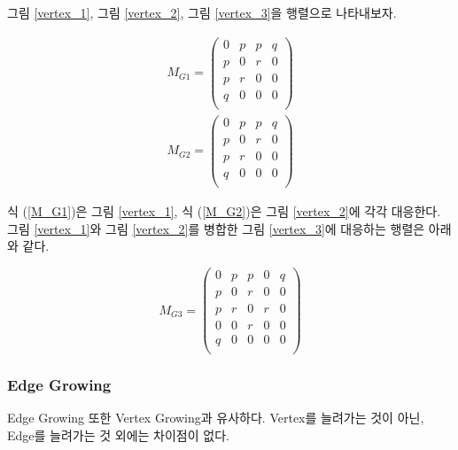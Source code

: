 \documentclass{oblivoir}
\begin{document}
				그림 \ref {vertex_1}, 그림 \ref {vertex_2}, 그림 \ref {vertex_3}을 행렬으로 나타내보자.
				
				\begin{align}
					M_{G1} = 
					\begin{pmatrix}\label{M_G1}
						0 & p & p & q \\
						p & 0 & r & 0 \\
						p & r & 0 & 0 \\
						q & 0 & 0 & 0 \\
					\end{pmatrix}
					\\
					M_{G2} = 
					\begin{pmatrix}\label{M_G2}
						0 & p & p & q \\
						p & 0 & r & 0 \\
						p & r & 0 & 0 \\
						q & 0 & 0 & 0 \\
					\end{pmatrix}
				\end{align}
				
				식 (\ref{M_G1})은 그림 \ref{vertex_1}, 식 (\ref{M_G2})은 그림 \ref{vertex_2}에 각각 대응한다. 그림 \ref{vertex_1}와 그림 \ref{vertex_2}를 병합한 그림 \ref{vertex_3}에 대응하는 행렬은 아래와 같다.
				
				$$
				M_{G3} = 
				\begin{pmatrix}\label{M_G3}
					0 & p & p & 0 & q \\
					p & 0 & r & 0 & 0 \\
					p & r & 0 & r & 0 \\
					0 & 0 & r & 0 & 0 \\
					q & 0 & 0 & 0 & 0 \\
				\end{pmatrix}
				$$
			\newpage
			\subsubsection{Edge Growing}
				Edge Growing 또한 Vertex Growing과 유사하다. Vertex를 늘려가는 것이 아닌, Edge를 늘려가는 것 외에는 차이점이 없다.
				
\end{document}
